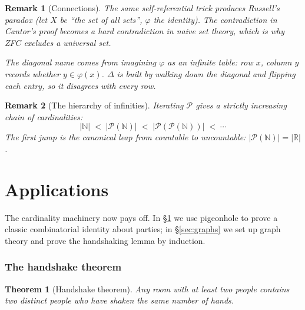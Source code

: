 \documentclass[11pt]{article}
\theoremstyle{defstyle}
\theoremstyle{thmstyle}
\newtheorem{theorem}{Theorem}[section]
\theoremstyle{notstyle}
\newtheorem*{remark}{Remark}
\theoremstyle{cautionstyle}
\newcommand{\N}{\mathbb{N}}
\newcommand{\R}{\mathbb{R}}
\newcommand{\card}[1]{\lvert #1 \rvert}
\newcommand{\Pow}{\mathcal{P}}
\begin{document}
\begin{notebox}
\begin{remark}[Connections]
The same self-referential trick produces \emph{Russell's paradox} (let
$X$ be ``the set of all sets'', $\varphi$ the identity).  The contradiction
in Cantor's proof becomes a hard contradiction in naive set theory, which
is why ZFC excludes a universal set.

The diagonal name comes from imagining $\varphi$ as an infinite table:
row $x$, column $y$ records whether $y \in \varphi(x)$.  $\Delta$ is built
by walking down the diagonal and \emph{flipping} each entry, so it
disagrees with every row.
\end{remark}
\end{notebox}

\begin{notebox}
\begin{remark}[The hierarchy of infinities]
Iterating $\Pow$ gives a strictly increasing chain of cardinalities:
\[
  \card{\N} \;<\; \card{\Pow(\N)} \;<\; \card{\Pow(\Pow(\N))} \;<\; \cdots
\]
The first jump is the canonical leap from countable to uncountable:
$\card{\Pow(\N)} = \card{\R}$.
\end{remark}
\end{notebox}

\newpage

\part{Applications}

The cardinality machinery now pays off.  In \S\ref{sec:handshake} we use
pigeonhole to prove a classic combinatorial identity about parties; in
\S\ref{sec:graphs} we set up graph theory and prove the handshaking lemma
by induction.

\section{The handshake theorem}\label{sec:handshake}

\begin{thmbox}
\begin{theorem}[Handshake theorem]
Any room with at least two people contains two distinct people who have
shaken the same number of hands.
\end{theorem}
\end{thmbox}
\end{document}
